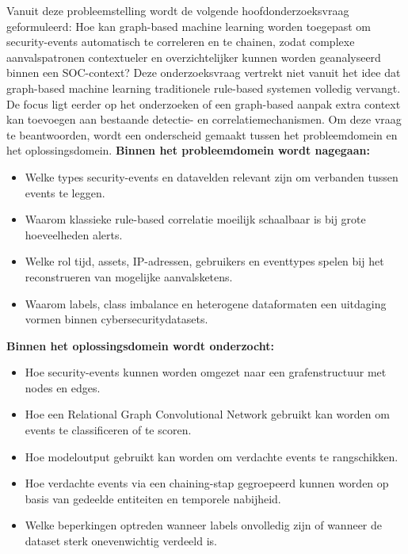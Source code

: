 Vanuit deze probleemstelling wordt de volgende hoofdonderzoeksvraag geformuleerd:
\newline
\newline
Hoe kan graph-based machine learning worden toegepast om security-events automatisch te correleren en te chainen, zodat complexe aanvalspatronen contextueler en overzichtelijker kunnen worden geanalyseerd binnen een SOC-context?
\newline
\newline
Deze onderzoeksvraag vertrekt niet vanuit het idee dat graph-based machine learning traditionele rule-based systemen volledig vervangt. De focus ligt eerder op het onderzoeken of een graph-based aanpak extra context kan toevoegen aan bestaande detectie- en correlatiemechanismen.
\newline
\newline
Om deze vraag te beantwoorden, wordt een onderscheid gemaakt tussen het probleemdomein en het oplossingsdomein.
\newline
\newline
\textbf{Binnen het probleemdomein wordt nagegaan:}
\begin{itemize}
    \item Welke types security-events en datavelden relevant zijn om verbanden tussen events te leggen.
    \item Waarom klassieke rule-based correlatie moeilijk schaalbaar is bij grote hoeveelheden alerts.
    \item Welke rol tijd, assets, IP-adressen, gebruikers en eventtypes spelen bij het reconstrueren van mogelijke aanvalsketens.
    \item Waarom labels, class imbalance en heterogene dataformaten een uitdaging vormen binnen cybersecuritydatasets.
\end{itemize}

\textbf{Binnen het oplossingsdomein wordt onderzocht:}
\begin{itemize}
    \item Hoe security-events kunnen worden omgezet naar een grafenstructuur met nodes en edges.
    \item Hoe een Relational Graph Convolutional Network gebruikt kan worden om events te classificeren of te scoren.
    \item Hoe modeloutput gebruikt kan worden om verdachte events te rangschikken.
    \item Hoe verdachte events via een chaining-stap gegroepeerd kunnen worden op basis van gedeelde entiteiten en temporele nabijheid.
    \item Welke beperkingen optreden wanneer labels onvolledig zijn of wanneer de dataset sterk onevenwichtig verdeeld is.
\end{itemize}

